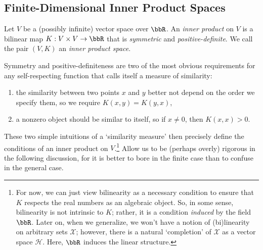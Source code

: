 \documentclass[twoside,11pt]{homework}
\begin{document}
\begin{multicols}{2}
\subsection{Finite-Dimensional Inner Product Spaces}
\begin{definition}\label{IP}
  Let $V$ be a (possibly infinite) vector space over $\bbR$. An \emph{inner product} on $V$ is a bilinear map $K : V \times V \to \bbR$
  that is \emph{symmetric} and \emph{positive-definite}. We call the pair $(V,K)$ an \emph{inner product space}.
\end{definition}
Symmetry and positive-definiteness are two of the most obvious requirements for any self-respecting function that calls itself a measure of similarity:
\begin{enumerate}
\item  the similarity between two points $x$ and $y$ better not depend on the order we specify them, so we require $K(x,y) = K(y,x)$,
\item a nonzero object should be similar to itself, so if $x \ne 0$, then $K(x,x) > 0$.
\end{enumerate}
These two simple intuitions of a `similarity measure' then precisely define the conditions of an inner product on $V$.\footnote{For now, we can just view bilinearity as a necessary condition to ensure that $K$ respects the real numbers as an algebraic object. So, in some sense, bilinearity is not intrinsic to $K$; rather, it is a condition \emph{induced} by the field $\bbR$. Later on, when we generalize, we won't have a notion of (bi)linearity on arbitrary sets $\mathcal{X}$; however, there is a natural `completion' of $\mathcal{X}$ as a vector space $\mathcal{H}$. Here, $\bbR$ induces the linear structure.} Allow us to be (perhaps overly) rigorous in the following discussion, for it is better to bore in the finite case than to confuse in the general case.


\end{multicols}
\end{document}
